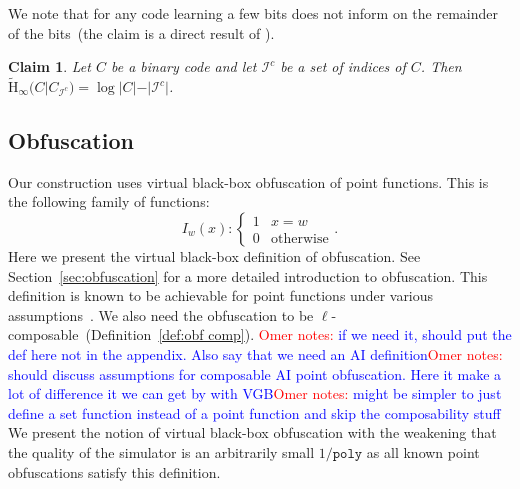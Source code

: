 \documentclass[11pt]{article}
\newcommand{\secref}[1]{\mbox{Section~\ref{#1}}}
\newcommand{\defref}[1]{\mbox{Definition~\ref{#1}}}
\newcommand{\poly}{\ensuremath{\mathtt{poly}}\xspace}
\newcommand{\Hav}{\tilde{\mathrm{H}}_\infty}
\newtheorem{claim}[theorem]{Claim}
\newcommand{\authnote}[2]{{\textcolor{red}{\textsf{#1 notes: }\textcolor{blue}{ #2}}\marginpar{\textcolor{red}{\textbf{!!!!!}}}}}
\newcommand{\authnote}[2]{}
\newcommand{\onote}[1]{{\authnote{Omer}{#1}}}
\begin{document}
We note that for any code learning a few bits does not inform on the remainder of the bits~(the claim is a direct result of \cite[Lemma 2.2b]{DBLP:journals/siamcomp/DodisORS08}).

\begin{claim}
\label{cl:many locations ent}
Let $C$ be a binary code and let $\mathcal{I}^c$ be a set of indices of $C$.  Then $\Hav(C | C_{\mathcal{I}^c}) = \log |C| - |\mathcal{I}^c|$.
\end{claim}

\subsection{Obfuscation}
Our construction uses virtual black-box obfuscation of point functions.  This is the following family of functions:
\[
I_w(x):\begin{cases} 1 & x=w\\0 & \text{otherwise}\end{cases}.
\]
Here we present the virtual black-box definition of obfuscation.  See \secref{sec:obfuscation} for a more detailed introduction to obfuscation.  This definition is known to be achievable for point functions under various assumptions~\cite{canetti1997towards, wee2005obfuscating}.  We also need the obfuscation to be $\ell$-composable~(\defref{def:obf comp}).
\onote{if we need it, should put the def here not in the appendix. Also say that we need an AI definition}\onote{should discuss assumptions for composable AI point obfuscation. Here it make a lot of difference it we can get by with VGB}\onote{might be simpler to just define a set function instead of a point function and skip the composability stuff}
We present the notion of virtual black-box obfuscation with the weakening that the quality of the simulator is an arbitrarily small $1/\poly$ as all known point obfuscations satisfy this definition.
\end{document}
